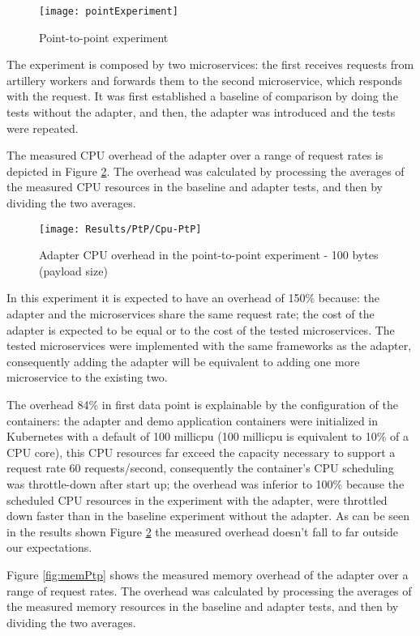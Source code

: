 \begin{figure}[htbp]
    \centering
    \centerline{\texttt{[image: pointExperiment]}}
    \caption{Point-to-point experiment}
    \label{fig:point}
\end{figure}

The experiment is composed by two microservices:
the first receives requests from artillery workers and forwards them to the second microservice, which responds with the request.
It was first established a baseline of comparison
by doing the tests without the adapter, and then, the adapter was introduced and the tests were repeated.

The measured CPU overhead of the adapter over a
range of request rates is depicted in Figure \ref{fig:cpuPtp}.
The overhead was calculated by processing the averages of the measured CPU resources in the baseline and adapter tests, and then by dividing the two averages.

\begin{figure}[htbp]
    \centering
    \centerline{\texttt{[image: Results/PtP/Cpu-PtP]}}
    \caption{Adapter CPU overhead in the point-to-point experiment - 100 bytes (payload size)}
    \label{fig:cpuPtp}
\end{figure}

In this experiment it is expected to have an overhead of 150\% because: the adapter and the microservices share the same request rate;
the cost of the adapter is expected to be equal or to the cost of the tested microservices.
The tested microservices were implemented with the same frameworks as the adapter, consequently adding the adapter will be equivalent to adding one more microservice to the existing two.

The overhead 84\% in first data point is explainable by the configuration of the containers:
the adapter and demo application containers were initialized in Kubernetes with a default of 100 millicpu (100 millicpu is equivalent to 10\% of a CPU core),
this CPU resources far exceed the capacity necessary to support a request rate 60 requests/second,
consequently the container's CPU scheduling was throttle-down after start up;
the overhead was inferior to 100\% because the scheduled CPU resources in the experiment with the adapter, were throttled down faster than in the baseline experiment without the adapter.
As can be seen in the results shown Figure \ref{fig:cpuPtp} the measured overhead doesn't fall to far outside our expectations.

Figure \ref{fig:memPtp} shows the measured memory overhead of the adapter over a
range of request rates.
The overhead was calculated by processing the averages of the measured memory resources in the baseline and adapter tests, and then by dividing the two averages.

